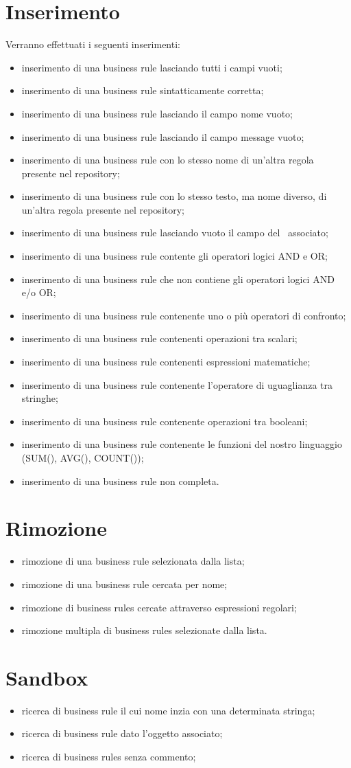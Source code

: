 \chapter{Inserimento}
Verranno effettuati i seguenti inserimenti:
\begin{itemize}
\item inserimento di una business rule lasciando tutti i campi vuoti;
\item inserimento di una business rule sintatticamente corretta;
\item inserimento di una business rule lasciando il campo nome vuoto;
\item inserimento di una business rule lasciando il campo message vuoto;
\item inserimento di una business rule con lo stesso nome di un'altra regola presente nel repository;
\item inserimento di una business rule con lo stesso testo, ma nome diverso, di un'altra regola presente nel repository;
\item inserimento di una business rule lasciando vuoto il campo del \bo\ associato;
\item inserimento di una business rule contente gli operatori logici AND e OR;
\item inserimento di una business rule che non contiene gli operatori logici AND e/o OR;
\item inserimento di una business rule contenente uno o pi\`u operatori di confronto;
\item inserimento di una business rule contenenti operazioni tra scalari;
\item inserimento di una business rule contenenti espressioni matematiche;
\item inserimento di una business rule contenente l'operatore di uguaglianza tra stringhe;
\item inserimento di una business rule contenente operazioni tra booleani;
\item inserimento di una business rule contenente le funzioni del nostro linguaggio (SUM(), AVG(), COUNT());
\item inserimento di una business rule non completa.
\end{itemize}
\chapter{Rimozione}
\begin{itemize}
\item rimozione di una business rule selezionata dalla lista;
\item rimozione di una business rule cercata per nome;
\item rimozione di business rules cercate attraverso espressioni regolari;
\item rimozione multipla di business rules selezionate dalla lista.
\end{itemize}
\chapter{Sandbox}
\begin{itemize}
\item ricerca di business rule il cui nome inzia con una determinata stringa; 
\item ricerca di business rule dato l'oggetto associato;
\item ricerca di business rules senza commento;
\end{itemize}


